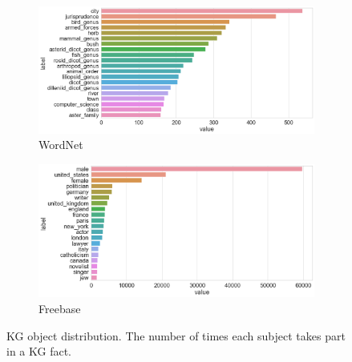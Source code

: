 \begin{figure}[H]
	\begin{subfigure}[b]{.5\linewidth}
   		\centering
    		\includegraphics[width=1.0\linewidth, height=0.7\linewidth]{Wordnet_Object_Counts}
		\captionsetup{justification=centering}
		\caption{WordNet}
	\end{subfigure}
	\begin{subfigure}[b]{.5\linewidth}
   		\centering
		\includegraphics[width=1.0\linewidth, height=0.7\linewidth]{Freebase_Object_Counts}
		\captionsetup{justification=centering}
		\caption{Freebase}
	\end{subfigure}
	\captionsetup{justification=centering}
	\caption{KG object distribution. The number of times each subject takes part in a KG fact.}
\end{figure}

